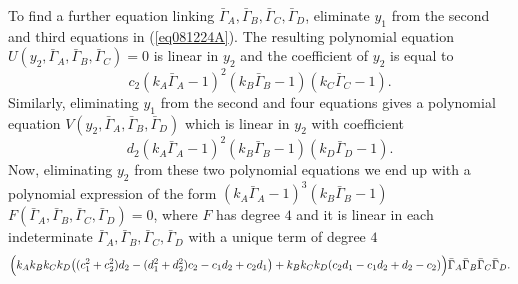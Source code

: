 \documentclass[10pt]{amsart}
\theoremstyle{definition}
\theoremstyle{remark}
\newcommand{\ha}{{\textstyle\frac{1}{2}}}
\begin{document}
To find a further equation linking $\bar{\Gamma}_A,\bar{\Gamma}_B,\bar{\Gamma}_C,\bar{\Gamma}_D$, eliminate $y_1$ from the second and third equations in (\ref{eq081224A}). The resulting polynomial equation $U(y_2,\bar{\Gamma}_A,\bar{\Gamma}_B,\bar{\Gamma}_C)=0$ is linear in $y_2$ and the coefficient of $y_2$ is equal to 
$$c_2(k_A\bar{\Gamma}_A-1)^2(k_B\bar{\Gamma}_B-1)(k_C\bar{\Gamma}_C-1).$$ 
Similarly, eliminating $y_1$ from the second and four equations gives a polynomial equation $V(y_2,\bar{\Gamma}_A,\bar{\Gamma}_B,\bar{\Gamma}_D)$ which is linear in $y_2$ with coefficient 
$$d_2(k_A\bar{\Gamma}_A-1)^2(k_B\bar{\Gamma}_B-1)(k_D\bar{\Gamma}_D-1).$$
Now, eliminating $y_2$ from these two polynomial equations we end up  
with a polynomial expression of the form $(k_A\bar{\Gamma}_A-1)^3(k_B\bar{\Gamma}_B-1)$ $F(\bar{\Gamma}_A,\bar{\Gamma}_B,\bar{\Gamma}_C,\bar{\Gamma}_D)=0$, where $F$ has degree $4$ and it is linear in each indeterminate $\bar{\Gamma}_A,\bar{\Gamma}_B,\bar{\Gamma}_C,\bar{\Gamma}_D$ with a unique term of degree $4$
\begin{equation}
\label{eq091224}
\Big(k_Ak_Bk_Ck_D\big((c_1^2+c_2^2)d_2-(d_1^2+d_2^2)c_2-c_1d_2+c_2d_1\big)+\\k_Bk_Ck_D(c_2d_1-c_1d_2+d_2-c_2)\Big)\bar{\Gamma}_A\bar{\Gamma}_B\bar{\Gamma}_C\bar{\Gamma}_D.
\end{equation}
\end{document}
